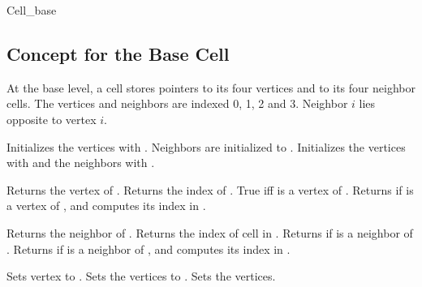 	\begin{ccClass}{Cell_base}
	\subsection{Concept for the Base Cell }


At the base level, a cell stores  pointers to its four
vertices and to its four neighbor cells. 
The vertices and neighbors are indexed 0, 1, 2 and 3. Neighbor $i$
lies opposite to vertex $i$.

\ccCreation

\ccGlue
{}
{Initializes the vertices with . Neighbors are
initialized to .} 
\ccGlue
{} 
{Initializes the vertices with  and the neighbors with
.}
                    
\ccAccessFunctions

{Returns the vertex  of \ccVar.
}
\ccGlue
{}
{Returns the index of .
}
\ccGlue
{}
{True iff  is a vertex of \ccVar.}
\ccGlue
{}
{Returns  if  is a vertex of \ccVar, and
computes its index  in \ccVar.}

{Returns  the neighbor  of \ccVar.
}
\ccGlue
{}
{Returns the index of cell  in \ccVar.
}
\ccGlue
{}
{Returns  if  is a neighbor of \ccVar.}
\ccGlue
{}
{Returns  if  is a neighbor of \ccVar,  and
computes its index  in \ccVar.}


{Sets vertex  to .
}
\ccGlue
{}
{Sets the vertices to .}
\ccGlue
{}
{Sets the vertices.}


\end{ccClass}
